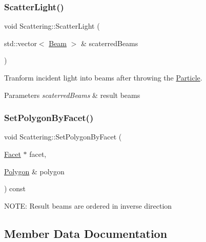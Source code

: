 \subsubsection{\texorpdfstring{Scatter\+Light()}{ScatterLight()}}
{\footnotesize\ttfamily void Scattering\+::\+Scatter\+Light (\begin{DoxyParamCaption}\item[{std\+::vector$<$ \mbox{\hyperlink{class_beam}{Beam}} $>$ \&}]{scaterred\+Beams }\end{DoxyParamCaption})}



Tranform incident light into beams after throwing the \mbox{\hyperlink{class_particle}{Particle}}. 


\begin{DoxyParams}{Parameters}
{\em scaterred\+Beams} & result beams \\
\hline
\end{DoxyParams}
\mbox{\label{class_scattering_abdf7a6563ec37996654fa59ab99bab3f}} 
\subsubsection{\texorpdfstring{Set\+Polygon\+By\+Facet()}{SetPolygonByFacet()}}
{\footnotesize\ttfamily void Scattering\+::\+Set\+Polygon\+By\+Facet (\begin{DoxyParamCaption}\item[{\mbox{\hyperlink{class_facet}{Facet}} $\ast$}]{facet,  }\item[{\mbox{\hyperlink{class_polygon}{Polygon}} \&}]{polygon }\end{DoxyParamCaption}) const\hspace{0.3cm}{\ttfamily [protected]}}

N\+O\+TE\+: Result beams are ordered in inverse direction 

\subsection{Member Data Documentation}
\mbox{\label{class_scattering_a82f0c3297cbde80cd091a503428f2dc5}} 
